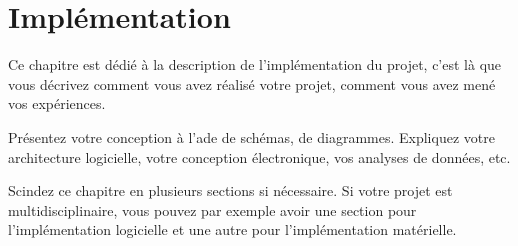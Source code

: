 \chapter{Implémentation}

Ce chapitre est dédié à la description de l'implémentation du projet, c'est là que vous décrivez comment vous avez réalisé votre projet, comment vous avez mené vos expériences.

Présentez votre conception à l'ade de schémas, de diagrammes. Expliquez votre architecture logicielle, votre conception électronique, vos analyses de données, etc.

Scindez ce chapitre en plusieurs sections si nécessaire. Si votre projet est multidisciplinaire, vous pouvez par exemple avoir une section pour l'implémentation logicielle et une autre pour l'implémentation matérielle.